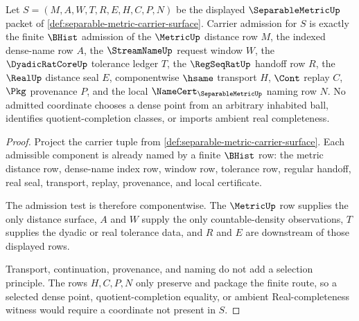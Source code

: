 \begin{theorem}
\label{thm:separablemetric-countable-density-carrier-admission}
Let $S=(M,A,W,T,R,E,H,C,P,N)$ be the displayed $\SeparableMetricUp$ packet of \autoref{def:separable-metric-carrier-surface}. Carrier admission for $S$ is exactly the finite $\BHist$ admission of the $\MetricUp$ distance row $M$, the indexed dense-name row $A$, the $\StreamNameUp$ request window $W$, the $\DyadicRatCoreUp$ tolerance ledger $T$, the $\RegSeqRatUp$ handoff row $R$, the $\RealUp$ distance seal $E$, componentwise $\hsame$ transport $H$, $\Cont$ replay $C$, $\Pkg$ provenance $P$, and the local $\NameCert_{\SeparableMetricUp}$ naming row $N$. No admitted coordinate chooses a dense point from an arbitrary inhabited ball, identifies quotient-completion classes, or imports ambient real completeness.
\end{theorem}
\begin{proof}
Project the carrier tuple from \autoref{def:separable-metric-carrier-surface}. Each admissible component is already named by a finite $\BHist$ row: the metric distance row, dense-name index row, window row, tolerance row, regular handoff, real seal, transport, replay, provenance, and local certificate.

The admission test is therefore componentwise. The $\MetricUp$ row supplies the only distance surface, $A$ and $W$ supply the only countable-density observations, $T$ supplies the dyadic or real tolerance data, and $R$ and $E$ are downstream of those displayed rows.

Transport, continuation, provenance, and naming do not add a selection principle. The rows $H,C,P,N$ only preserve and package the finite route, so a selected dense point, quotient-completion equality, or ambient Real-completeness witness would require a coordinate not present in $S$.
\end{proof}

